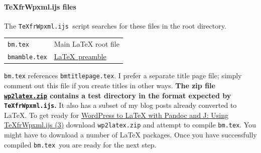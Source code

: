 \paragraph{TeXfrWpxml.ijs files}

The \texttt{TeXfrWpxml.ijs~}script searches for these files in the root
directory.

\begin{center}
\begin{tabular}{lp{}} 
   \texttt{bm.tex}         & Main LaTeX root file  \\ 
   \texttt{bmamble.tex}    & \href{http://www.charlietanksley.net/philtex/my-idosyncratic-latex-preamble/}{\LaTeX\
preamble}            \\ 
\end{tabular}
\end{center}

\noindent\texttt{bm.tex} references \texttt{bmtitlepage.tex}. I prefer a separate
title page file; simply comment out this file if you create titles in
other ways. \textbf{The zip file
\href{http://www.box.com/s/nioua15kpdod5lvruaxe}{\texttt{wp2latex.zip}}
contains a test directory in the format expected by
\texttt{TeXfrWpxml.ijs}.} It also has a subset of my blog posts already
converted to \LaTeX. To get ready for
\href{http://bakerjd99.wordpress.com/2012/02/25/wordpress-to-latex-with-pandoc-and-j-using-texfrwpxml-ijs-part-3/}{WordPress
to LaTeX with Pandoc and J: Using TeXfrWpxml.ijs (3)} download
\texttt{wp2latex.zip} and attempt to compile \texttt{bm.tex}. You might
have to download a number of LaTeX packages. Once you have successfully
compiled \texttt{bm.tex~}you are ready for the next step.




%